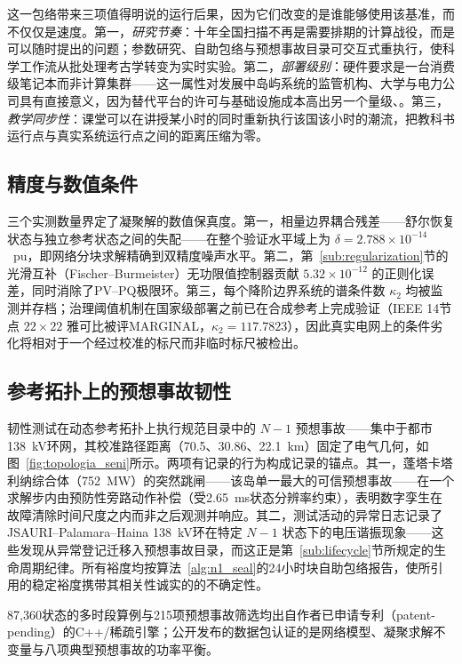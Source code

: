 这一包络带来三项值得明说的运行后果，因为它们改变的是谁能够使用该基准，而不仅仅是速度。第一，\emph{研究节奏}：十年全国扫描不再是需要排期的计算战役，而是可以随时提出的问题；参数研究、自助包络与预想事故目录可交互式重执行，使科学工作流从批处理考古学转变为实时实验。第二，\emph{部署级别}：硬件要求是一台消费级笔记本而非计算集群——这一属性对发展中岛屿系统的监管机构、大学与电力公司具有直接意义，因为替代平台的许可与基础设施成本高出另一个量级\cite{ieee399}、\cite{matpower2011}。第三，\emph{教学同步性}：课堂可以在讲授某小时的同时重新执行该国该小时的潮流，把教科书运行点与真实系统运行点之间的距离压缩为零。

\subsection{精度与数值条件}
\label{sub:accuracy}

三个实测数量界定了凝聚解的数值保真度。第一，相量边界耦合残差——舒尔恢复状态与独立参考状态之间的失配——在整个验证水平域上为 $\delta = 2.788 \times 10^{-14}$~pu，即网络分块求解精确到双精度噪声水平。第二，第~\ref{sub:regularization}节的光滑互补（Fischer--Burmeister）无功限值控制器贡献 $5.32 \times 10^{-12}$ 的正则化误差，同时消除了PV--PQ极限环。第三，每个降阶边界系统的谱条件数 $\kappa_2$ 均被监测并存档；治理阈值机制在国家级部署之前已在合成参考上完成验证（IEEE 14节点 $22\times22$ 雅可比被评MARGINAL，$\kappa_2 = 117.7823$），因此真实电网上的条件劣化将相对于一个经过校准的标尺而非临时标尺被检出。

\subsection{参考拓扑上的预想事故韧性}
\label{sub:contingencies}

韧性测试在动态参考拓扑上执行规范目录中的 $N-1$ 预想事故\cite{ejebe1979}——集中于都市138~kV环网，其校准路径距离（70.5、30.86、22.1~km）固定了电气几何，如图~\ref{fig:topologia_seni}所示。两项有记录的行为构成记录的锚点。其一，蓬塔卡塔利纳综合体（752~MW）的突然跳闸——该岛单一最大的可信预想事故——在一个求解步内由预防性旁路动作补偿（受2.65~ms状态分辨率约束），表明数字孪生在故障清除时间尺度之内而非之后观测并响应。其二，测试活动的异常日志记录了JSAURI--Palamara--Haina 138~kV环在特定 $N-1$ 状态下的电压谐振现象——这些发现从异常登记迁移入预想事故目录，而这正是第~\ref{sub:lifecycle}节所规定的生命周期纪律。所有裕度均按算法~\ref{alg:n1_seal}的24小时块自助包络报告，使所引用的稳定裕度携带其相关性诚实的的不确定性。

87,360状态的多时段算例与215项预想事故筛选均出自作者已申请专利（patent-pending）的C++/稀疏引擎；公开发布的数据包认证的是网络模型、凝聚求解不变量与八项典型预想事故的功率平衡。


